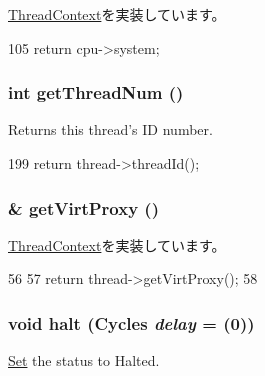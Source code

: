 \hyperlink{classThreadContext_a4585cb7174e215741001b70fafe6662e}{ThreadContext}を実装しています。


\begin{DoxyCode}
105 { return cpu->system; }
\end{DoxyCode}
\hypertarget{classInOrderThreadContext_a97f81432e1b0b5bcfcf87a7fb6b03e17}{
\subsubsection[{getThreadNum}]{\setlength{\rightskip}{0pt plus 5cm}int getThreadNum ()}}
\label{classInOrderThreadContext_a97f81432e1b0b5bcfcf87a7fb6b03e17}
Returns this thread's ID number. 


\begin{DoxyCode}
199 { return thread->threadId(); }
\end{DoxyCode}
\hypertarget{classInOrderThreadContext_a03a07ebd804051b18b69156c2fff36a3}{
\subsubsection[{getVirtProxy}]{ \& getVirtProxy ()}}
\label{classInOrderThreadContext_a03a07ebd804051b18b69156c2fff36a3}


\hyperlink{classThreadContext_a55e3a4b93d5f1ad641247f6d223191c6}{ThreadContext}を実装しています。


\begin{DoxyCode}
56 {
57     return thread->getVirtProxy();
58 }
\end{DoxyCode}
\hypertarget{classInOrderThreadContext_ade40686c5cdae8911d4062b9bf3d5340}{
\subsubsection[{halt}]{\setlength{\rightskip}{0pt plus 5cm}void halt ({\bf Cycles} {\em delay} = {(0)})}}
\label{classInOrderThreadContext_ade40686c5cdae8911d4062b9bf3d5340}
\hyperlink{classSet}{Set} the status to Halted. 

